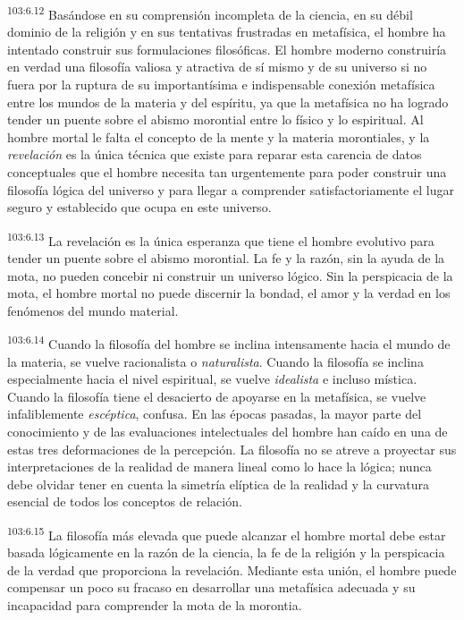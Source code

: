 \par
\textsuperscript{103:6.12} Basándose en su comprensión incompleta de la ciencia, en su débil dominio de la religión y en sus tentativas frustradas en metafísica, el hombre ha intentado construir sus formulaciones filosóficas. El hombre moderno construiría en verdad una filosofía valiosa y atractiva de sí mismo y de su universo si no fuera por la ruptura de su importantísima e indispensable conexión metafísica entre los mundos de la materia y del espíritu, ya que la metafísica no ha logrado tender un puente sobre el abismo morontial entre lo físico y lo espiritual. Al hombre mortal le falta el concepto de la mente y la materia morontiales, y la \textit{revelación} es la única técnica que existe para reparar esta carencia de datos conceptuales que el hombre necesita tan urgentemente para poder construir una filosofía lógica del universo y para llegar a comprender satisfactoriamente el lugar seguro y establecido que ocupa en este universo.

\par
\textsuperscript{103:6.13} La revelación es la única esperanza que tiene el hombre evolutivo para tender un puente sobre el abismo morontial. La fe y la razón, sin la ayuda de la mota, no pueden concebir ni construir un universo lógico. Sin la perspicacia de la mota, el hombre mortal no puede discernir la bondad, el amor y la verdad en los fenómenos del mundo material.

\par
\textsuperscript{103:6.14} Cuando la filosofía del hombre se inclina intensamente hacia el mundo de la materia, se vuelve racionalista o \textit{naturalista}. Cuando la filosofía se inclina especialmente hacia el nivel espiritual, se vuelve \textit{idealista} e incluso mística. Cuando la filosofía tiene el desacierto de apoyarse en la metafísica, se vuelve infaliblemente \textit{escéptica}, confusa. En las épocas pasadas, la mayor parte del conocimiento y de las evaluaciones intelectuales del hombre han caído en una de estas tres deformaciones de la percepción. La filosofía no se atreve a proyectar sus interpretaciones de la realidad de manera lineal como lo hace la lógica; nunca debe olvidar tener en cuenta la simetría elíptica de la realidad y la curvatura esencial de todos los conceptos de relación.

\par
\textsuperscript{103:6.15} La filosofía más elevada que puede alcanzar el hombre mortal debe estar basada lógicamente en la razón de la ciencia, la fe de la religión y la perspicacia de la verdad que proporciona la revelación. Mediante esta unión, el hombre puede compensar un poco su fracaso en desarrollar una metafísica adecuada y su incapacidad para comprender la mota de la morontia.

